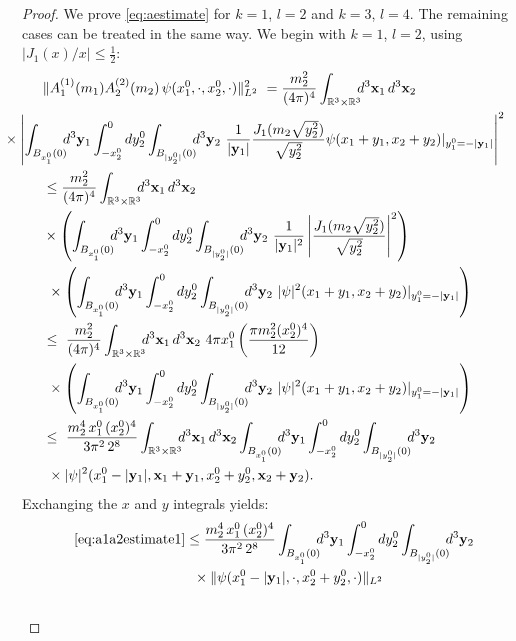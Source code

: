 \documentclass[b5paper,draft,openbib,12pt]{memoir}
\newcommand{\R}{\mathbb{R}}
\newcommand{\vx}{\mathbf{x}}
\newcommand{\vy}{\mathbf{y}}
\begin{document}
\begin{proof}
  We prove \eqref{eq:aestimate} for $k=1$, $ l=2$ and $k=3$, $l=4$. 
  The remaining cases can be treated in the same way. We begin with 
  $k=1$, $l=2$, using $|J_1(x)/x| \leq \frac{1}{2}$:
\begin{align}
	&\| A_1^{(1)}(m_1) A_2^{(2)}(m_2)\, \psi(x_1^0,\cdot,x_2^0,\cdot) \|^2_{L^2} ~= \frac{m_2^2}{(4\pi)^4} \int_{\R^3 \times \R^3} \!\!\! d^3 \vx_1 \, d^3 \vx_2 \\
&\hspace{-1cm}\times \left| \int_{B_{x_1^0}(0)} \!\!\! d^3\vy_1 \int_{-x_2^0}^0 dy_2^0 \int_{B_{|y_2^0|}(0)} \!\!\! d^3 \vy_2 ~\frac{1}{|\vy_1|}  \frac{J_1(m_2\sqrt{y_2^2})}{\sqrt{y_2^2}}\psi(x_1+y_1,x_2+y_2)|_{y^0_1=-|\vy_1|} \right|^2\nonumber\\
&\leq \frac{m_2^2}{(4\pi)^4} \int_{\R^3 \times \R^3}  \!\!\! d^3 \vx_1 \, d^3 \vx_2 \notag\\
&\times \left( \int_{B_{x_1^0}(0)} \!\!\! d^3\vy_1 \int_{-x_2^0}^0 dy_2^0 \int_{B_{|y_2^0|}(0)} \!\!\! d^3 \vy_2~ \frac{1}{|\vy_1|^2} \left| \frac{J_1(m_2\sqrt{y_2^2})}{\sqrt{y_2^2}} \right|^2 \right)\nonumber\\
&~\times \left( \int_{B_{x_1^0}(0)} \!\!\! d^3\vy_1 \int_{-x_2^0}^0 dy_2^0 \int_{B_{|y_2^0|}(0)} \!\!\! d^3 \vy_2 ~|\psi|^2(x_1+y_1,x_2+y_2)|_{y^0_1=-|\vy_1|} \right)\nonumber\\
&\leq~  \frac{m_2^2}{(4\pi)^4} \int_{\R^3 \times \R^3}  \!\!\! d^3 \vx_1 \, d^3 \vx_2 ~4\pi x_1^0 \left( \frac{\pi m_2^2 (x_2^0)^4}{12}\right) \nonumber\\
&~\times \left( \int_{B_{x_1^0}(0)} \!\!\! d^3\vy_1 \int_{-x_2^0}^0 dy_2^0 \int_{B_{|y_2^0|}(0)} \!\!\! d^3 \vy_2 ~|\psi|^2(x_1+y_1,x_2+y_2)|_{y^0_1=-|\vy_1|} \right)\nonumber\\
&\leq~  \frac{m_2^4 \, x_1^0 \,  (x_2^0)^4}{3 \pi^2\, 2^8 } \int_{\R^3 \times \R^3}  \!\!\! d^3 \vx_1 \, d^3 \vx_2  \int_{B_{x_1^0}(0)} \!\!\! d^3\vy_1 \int_{-x_2^0}^0 dy_2^0 \int_{B_{|y_2^0|}(0)} \!\!\! d^3 \vy_2\nonumber\\
&~\times |\psi|^2(x_1^0 - |\vy_1|,\vx_1+\vy_1,x_2^0 + y_2^0,\vx_2+\vy_2).
\label{eq:a1a2estimate1}
\end{align}
Exchanging the $x$ and $y$ integrals yields:
\begin{align}\nonumber
&\eqref{eq:a1a2estimate1} \leq  \frac{m_2^4 \, x_1^0\,  (x_2^0)^4}{3 \pi^2\, 2^8 } \int_{B_{x_1^0}(0)} \!\!\! d^3\vy_1 \int_{-x_2^0}^0 dy_2^0 \int_{B_{|y_2^0|}(0)} \!\!\! d^3 \vy_2 \\
&\hspace{3cm}\times\| \psi(x_1^0 - |\vy_1|,\cdot,x_2^0 + y_2^0,\cdot)\|_{L^2} \nonumber\\\nonumber

\end{align}
\end{proof}
\end{document}
